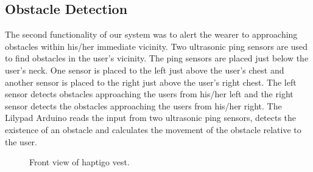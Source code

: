 \documentclass{sigchi}
\begin{document}
\subsection{Obstacle Detection}
The second functionality of our system was to alert the wearer to approaching obstacles within his/her immediate vicinity. Two ultrasonic ping sensors \cite{PingSensor} are used to find obstacles in the user’s vicinity. The ping sensors are placed just below the user’s neck. One sensor is placed to the left just above the user’s chest and another sensor is placed to the right just above the user’s right chest. The left sensor detects obstacles approaching the users from his/her left and the right sensor detects the obstacles approaching the users from his/her right. The Lilypad Arduino \cite{Arduino} reads the input from two ultrasonic ping sensors, detects the existence of an obstacle and calculates the movement of the obstacle relative to the user. 

\begin{figure}
\centering
{}
\caption{Front view of haptigo vest.}
\label{figure:haptigo:front}
\end{figure}
\end{document}
